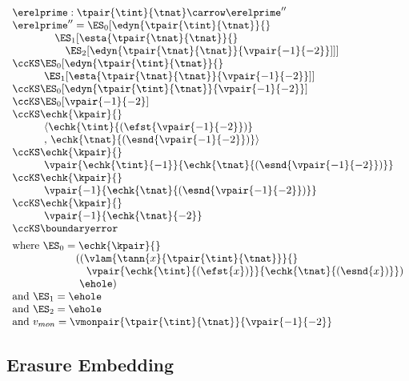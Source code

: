 $\begin{array}{l}
  \erelprime : \tpair{\tint}{\tnat} \carrow \erelprime''
\\\erelprime'' = \ES_0[\edyn{\tpair{\tint}{\tnat}}{}
\\\qquad\quad\quad \ES_1[\esta{\tpair{\tnat}{\tnat}}{}
\\\qquad\quad\quad\quad \ES_2[\edyn{\tpair{\tnat}{\tnat}}{\vpair{-1}{-2}}]]]
\\\ccKS \ES_0[\edyn{\tpair{\tint}{\tnat}}{}
\\\qquad\quad \ES_1[\esta{\tpair{\tnat}{\tnat}}{\vpair{-1}{-2}}]]
\\\ccKS \ES_0[\edyn{\tpair{\tint}{\tnat}}{\vpair{-1}{-2}}]
\\\ccKS \ES_0[\vpair{-1}{-2}]
\\\ccKS \echk{\kpair}{}
\\\qquad\quad \langle{\echk{\tint}{(\efst{\vpair{-1}{-2}})}}
\\\qquad\quad ,\,{\echk{\tnat}{(\esnd{\vpair{-1}{-2}})}}\rangle
\\\ccKS \echk{\kpair}{}
\\\qquad\quad \vpair{\echk{\tint}{{-1}}}{\echk{\tnat}{(\esnd{\vpair{-1}{-2}})}}
\\\ccKS \echk{\kpair}{}
\\\qquad\quad \vpair{-1}{\echk{\tnat}{(\esnd{\vpair{-1}{-2}})}}
\\\ccKS \echk{\kpair}{}
\\\qquad\quad \vpair{-1}{\echk{\tnat}{{-2}}}
\\\ccKS \boundaryerror
\\[1ex]
  \mbox{where } \ES_0 = \echk{\kpair}{}
\\\qquad\qquad\qquad ((\vlam{\tann{x}{\tpair{\tint}{\tnat}}}{}
\\\qquad\qquad\qquad\quad {\vpair{\echk{\tint}{(\efst{x})}}{\echk{\tnat}{(\esnd{x})}}})
\\\qquad\qquad\qquad\ {\ehole})
\\\mbox{and } \ES_1 = \ehole
\\\mbox{and } \ES_2 = \ehole
\\\mbox{and } v_{mon} = \vmonpair{\tpair{\tint}{\tnat}}{\vpair{-1}{-2}}
\end{array}$

\subsection{Erasure Embedding}

